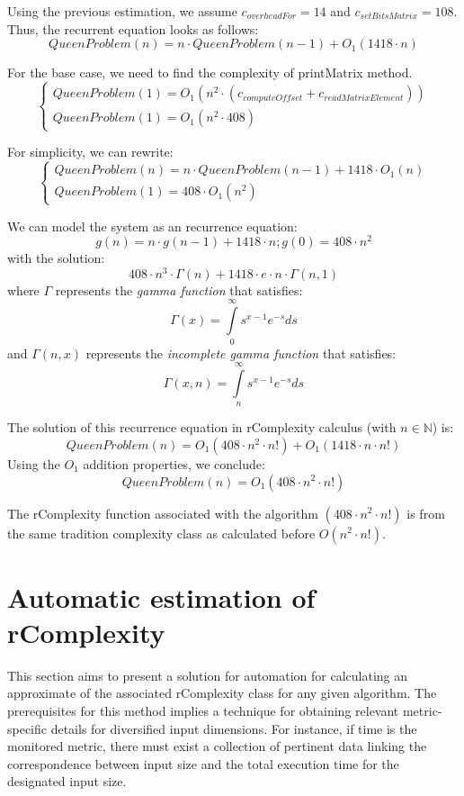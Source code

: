 Using the previous estimation, we assume $c_{overheadFor} = 14$ and $c_{setBitsMatrix} = 108$. Thus, the recurrent equation looks as follows: 
\[QueenProblem(n) = n \cdot QueenProblem(n-1) +  O_{1}(1418 \cdot n) \]

For the base case, we need to find the complexity of printMatrix method.
\[ \begin{cases} QueenProblem(1)=O_{1}(n^{2} \cdot  (c_{computeOffset} + c_{readMatrixElement})) \\ QueenProblem(1)=O_{1}(n^{2} \cdot  408) \end{cases}\]

For simplicity, we can rewrite:
\[ \begin{cases} QueenProblem(n) = n \cdot QueenProblem(n-1) +  1418 \cdot O_{1}(n) \\ QueenProblem(1)= 408 \cdot O_{1}(n^{2}) \end{cases}\]

We can model the system as an recurrence equation:
\[ g(n) = n \cdot  g(n-1) + 1418 \cdot  n; g(0) = 408 \cdot  n^{2} \]
with the solution:
\[ 408 \cdot n^{3} \cdot \Gamma(n) + 1418 \cdot e \cdot  n \cdot \Gamma(n, 1)\]
where $\Gamma$ represents the \textit{gamma function} that satisfies: \[ \Gamma \left( x \right) = \int\limits_0^\infty {s^{x - 1} e^{ - s} ds} \] and $ \Gamma(n,x)$ represents the \textit{incomplete gamma function} that satisfies: \[ \Gamma \left(x, n \right) = \int\limits_n^\infty {s^{x - 1} e^{ - s} ds}\]

The solution of this recurrence equation in rComplexity calculus (with $n \in \mathbb{N}$) is:
\[ QueenProblem(n) = O_{1}(408 \cdot n^{2} \cdot n!) +  O_{1}(1418 \cdot n \cdot n!) \]
Using the $O_{1}$ addition properties, we conclude:
\[ QueenProblem(n) = O_{1}(408 \cdot n^{2} \cdot n!) \]

\begin{remark}
The rComplexity function associated with the algorithm $(408 \cdot n^{2} \cdot n!)$ is from the same tradition complexity class as calculated before $ O(n^2\cdot n!)$.
\end{remark}


\section{Automatic estimation of rComplexity}
This section aims to present a solution for automation for calculating an approximate of the associated rComplexity class for any given algorithm. The prerequisites for this method implies a technique for obtaining relevant metric-specific details for diversified input dimensions. For instance, if time is the monitored metric, there must exist a collection of pertinent data linking the correspondence between input size and the total execution time for the designated input size.

